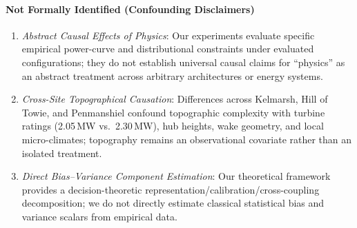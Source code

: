 \paragraph{Not Formally Identified (Confounding Disclaimers)}
\begin{enumerate}[leftmargin=*, label=(\roman*)]
\item \textit{Abstract Causal Effects of Physics}: Our experiments evaluate specific empirical power-curve and distributional constraints under evaluated configurations; they do not establish universal causal claims for ``physics'' as an abstract treatment across arbitrary architectures or energy systems.
\item \textit{Cross-Site Topographical Causation}: Differences across Kelmarsh, Hill of Towie, and Penmanshiel confound topographic complexity with turbine ratings (2.05\,MW vs.\ 2.30\,MW), hub heights, wake geometry, and local micro-climates; topography remains an observational covariate rather than an isolated treatment.
\item \textit{Direct Bias--Variance Component Estimation}: Our theoretical framework provides a decision-theoretic representation/calibration/cross-coupling decomposition; we do not directly estimate classical statistical bias and variance scalars from empirical data.
\end{enumerate}
